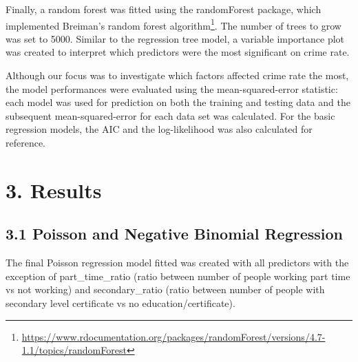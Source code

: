 \documentclass[
]{article}
\begin{document}
Finally, a random forest was fitted using the randomForest package,
which implemented Breiman's random forest algorithm\footnote{\url{https://www.rdocumentation.org/packages/randomForest/versions/4.7-1.1/topics/randomForest}}.
The number of trees to grow was set to 5000. Similar to the regression
tree model, a variable importance plot was created to interpret which
predictors were the most significant on crime rate.

Although our focus was to investigate which factors affected crime rate
the most, the model performances were evaluated using the
mean-squared-error statistic: each model was used for prediction on both
the training and testing data and the subsequent mean-squared-error for
each data set was calculated. For the basic regression models, the AIC
and the log-likelihood was also calculated for reference.

\hypertarget{results}{%
\section{3. Results}\label{results}}

\hypertarget{poisson-and-negative-binomial-regression}{%
\subsection{3.1 Poisson and Negative Binomial
Regression}\label{poisson-and-negative-binomial-regression}}

The final Poisson regression model fitted was created with all
predictors with the exception of part\_time\_ratio (ratio between number
of people working part time vs not working) and secondary\_ratio (ratio
between number of people with secondary level certificate vs no
education/certificate).
\end{document}
